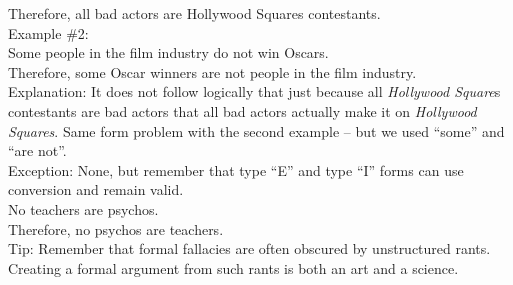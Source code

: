 \documentclass[a4paper,12pt,single,pdftex]{scrartcl}
\begin{document}
    
      Therefore, all bad actors are Hollywood Squares contestants.
    \\

    
      Example \#2:
    \\

    
      Some people in the film industry do not win Oscars.
    \\

    
      Therefore, some Oscar winners are not people in the film industry.
    \\

    
      Explanation: It does not follow logically that just because all {\it Hollywood Square}s contestants are bad actors that all bad actors actually make it on {\it Hollywood Squares}.  Same form problem with the second example -- but we used “some” and “are not”.
    \\

    
      Exception: None, but remember that type “E” and type “I” forms can use conversion and remain valid.
    \\

    
      No teachers are psychos.
    \\

    
      Therefore, no psychos are teachers.
    \\

    
      Tip: Remember that formal fallacies are often obscured by unstructured rants. Creating a formal argument from such rants is both an art and a science.
    \\
\end{document}
